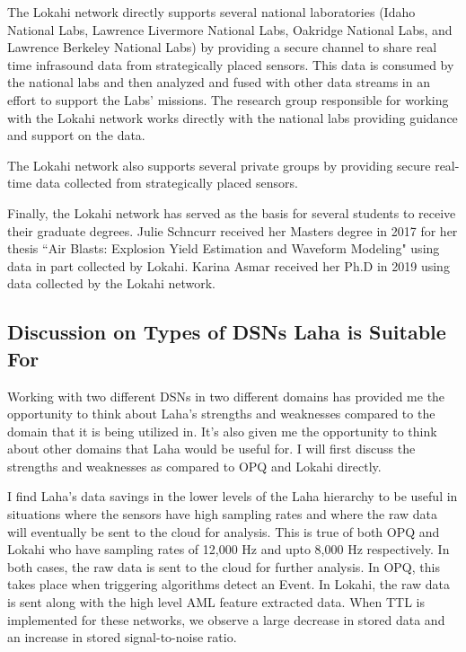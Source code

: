 The Lokahi network directly supports several national laboratories (Idaho National Labs, Lawrence Livermore National Labs, Oakridge National Labs, and Lawrence Berkeley National Labs) by providing a secure channel to share real time infrasound data from strategically placed sensors. This data is consumed by the national labs and then analyzed and fused with other data streams in an effort to support the Labs' missions. The research group responsible for working with the Lokahi network works directly with the national labs providing guidance and support on the data.

The Lokahi network also supports several private groups by providing secure real-time data collected from strategically placed sensors.

Finally, the Lokahi network has served as the basis for several students to receive their graduate degrees. Julie Schncurr received her Masters degree in 2017 for her thesis ``Air Blasts: Explosion Yield Estimation and Waveform Modeling"\cite{julie} using data in part collected by Lokahi. Karina Asmar received her Ph.D\cite{asmar19} in 2019 using data collected by the Lokahi network.

\subsection{Discussion on Types of DSNs Laha is Suitable For}\label{subsec:discussion-on-types-of-dsns-laha-is-suitable-for}

Working with two different DSNs in two different domains has provided me the opportunity to think about Laha's strengths and weaknesses compared to the domain that it is being utilized in. It's also given me the opportunity to think about other domains that Laha would be useful for. I will first discuss the strengths and weaknesses as compared to OPQ and Lokahi directly.

I find Laha's data savings in the lower levels of the Laha hierarchy to be useful in situations where the sensors have high sampling rates and where the raw data will eventually be sent to the cloud for analysis. This is true of both OPQ and Lokahi who have sampling rates of 12,000 Hz and upto 8,000 Hz respectively. In both cases, the raw data is sent to the cloud for further analysis. In OPQ, this takes place when triggering algorithms detect an Event. In Lokahi, the raw data is sent along with the high level AML feature extracted data. When TTL is implemented for these networks, we observe a large decrease in stored data and an increase in stored signal-to-noise ratio.

